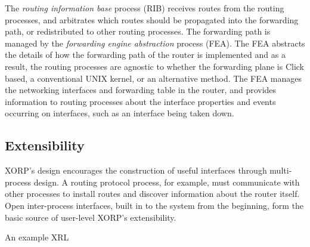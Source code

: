 
The \emph{routing information base} process (RIB) receives routes from
the routing processes, and arbitrates which routes should be
propagated into the forwarding path, or redistributed to other routing
processes.  The forwarding path is managed
by the \emph{forwarding engine abstraction} process (FEA).  The FEA
abstracts the details of how the forwarding path of the router is
implemented and as a result, the routing processes are agnostic to
whether the forwarding plane is Click \cite{click} based, a conventional UNIX
kernel, or an alternative method.  The FEA manages the networking
interfaces and forwarding table in the router, and provides information to routing processes
about the interface properties and events occurring on interfaces, such as an
interface being taken down.


\subsection{Extensibility}

XORP's design encourages the construction of useful
interfaces through multi-process design.
A routing protocol process, for example, must communicate with other
processes to install routes and discover information about the router
itself.
Open inter-process interfaces, built in to the system from the beginning,
form the basic source of user-level XORP's extensibility.

%
\begin{floatingfigure}[r]{3.3in} %
\centerline{}
\caption{An example XRL}
\label{fig:xrl}
\vspace{-0.1in}
\end{floatingfigure}

